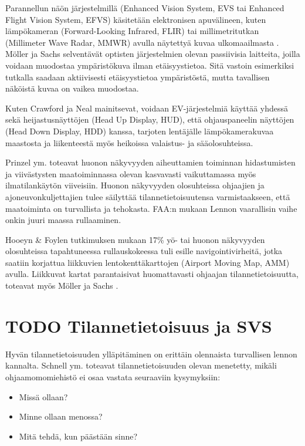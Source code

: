 \documentclass[utf8,bachelor,manualbib]{gradu3}
\begin{document}
Parannellun näön järjestelmillä (Enhanced Vision System, EVS tai Enhanced Flight Vision System, EFVS) käsitetään elektronisen apuvälineen, kuten lämpökameran (Forward-Looking Infrared, FLIR) tai millimetritutkan (Millimeter Wave Radar, MMWR) avulla näytettyä kuvaa ulkomaailmasta \citep{baileyym2007}. Möller ja Sachs \citeyearpar{mollersachs1994} selventävät optisten järjestelmien olevan passiivisia laitteita, joilla voidaan muodostaa ympäristökuva ilman etäisyystietoa. Sitä vastoin esimerkiksi tutkalla saadaan aktiivisesti etäisyystietoa ympäristöstä, mutta tavallisen näköistä kuvaa on vaikea muodostaa.

Kuten Crawford ja Neal \citeyearpar{crawfordneal2006} mainitsevat, voidaan EV-järjestelmiä käyttää yhdessä sekä heijastusnäyttöjen (Head Up Display, HUD), että ohjauspaneelin näyttöjen (Head Down Display, HDD) kanssa, tarjoten lentäjälle lämpökamerakuvaa maastosta ja liikenteestä myös heikoissa valaistus- ja sääolosuhteissa.

Prinzel ym. \citeyearpar{prinzel2013} toteavat huonon näkyvyyden aiheuttamien toiminnan hidastumisten ja viivästysten maatoiminnassa olevan kasvavasti vaikuttamassa myös ilmatilankäytön viiveisiin. Huonon näkyvyyden olosuhteissa ohjaajien ja ajoneuvonkuljettajien tulee säilyttää tilannetietoisuutensa varmistaakseen, että maatoiminta on turvallista ja tehokasta. FAA:n mukaan \citeyearpar{gerold2001} Lennon vaarallisin vaihe onkin juuri maassa rullaaminen.

Hooeyn \& Foylen \citeyearpar{hooey2007} tutkimuksen mukaan 17\% yö- tai huonon näkyvyyden olosuhteissa tapahtuneessa rullauskokeessa tuli esille navigointivirheitä, jotka saatiin korjattua liikkuvien lentokenttäkarttojen (Airport Moving Map, AMM) avulla. Liikkuvat kartat parantaisivat huomattavasti ohjaajan tilannetietoisuutta, toteavat myös Möller ja Sachs \citeyearpar{mollersachs1994}.

\section{TODO Tilannetietoisuus ja SVS}

Hyvän tilannetietoisuuden ylläpitäminen on erittäin olennaista turvallisen lennon kannalta. Schnell ym. \citeyearpar{schnellym2004} toteavat tilannetietoisuuden olevan menetetty, mikäli ohjaamomomiehistö ei osaa vastata seuraaviin kysymyksiin:

\begin{itemize}
\item Missä ollaan?
\item Minne ollaan menossa?
\item Mitä tehdä, kun päästään sinne?
\end{itemize}
\end{document}
